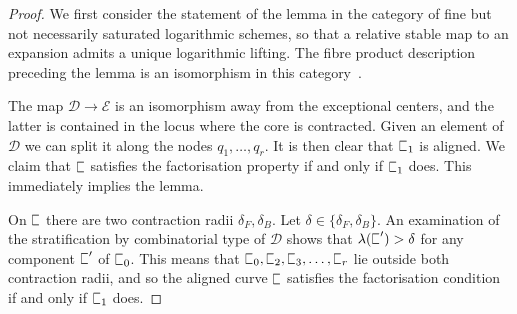 \documentclass[11pt]{amsart}
\newcommand{\sqC}{\scalebox{0.8}[1.3]{$\sqsubset$}}
\newcommand{\PP}{\mathbb P}
\renewcommand{\to}{\rightarrow}
\newcommand{\Dcal}{\mathcal{D}}
\newcommand{\Ecal}{\mathcal{E}}
\theoremstyle{definition}
\newtheorem{lemma}[thm]{Lemma}
\theoremstyle{definition}
\begin{document}
\begin{proof}
We first consider the statement of the lemma in the category of fine but not necessarily saturated logarithmic schemes, so that a relative stable map to an expansion admits a unique logarithmic lifting. The fibre product description preceding the lemma is an isomorphism in this category~\cite[Lemma~4.2.2]{AbramovichMarcusWiseComparison}.

The map $\Dcal\to\Ecal$ is an isomorphism away from the exceptional centers, and the latter is contained in the locus where the core is contracted. Given an element of $\Dcal$ we can split it along the nodes $q_1,\ldots,q_r$. It is then clear that $\sqC_1$ is aligned. We claim that $\sqC$ satisfies the factorisation property if and only if $\sqC_1$ does. This immediately implies the lemma.

On $\sqC$ there are two contraction radii $\delta_F,\delta_B$. Let $\delta \in \{\delta_F,\delta_B\}$. An examination of the stratification by combinatorial type of $\Dcal$ shows that $\lambda(\sqC^\prime) > \delta$ for any component $\sqC^\prime$ of $\sqC_0$. This means that $\sqC_0,\sqC_2,\sqC_3,\ldots,\sqC_r$ lie outside both contraction radii, and so the aligned curve $\sqC$ satisfies the factorisation condition if and only if $\sqC_1$ does. \end{proof}

%
\end{document}
